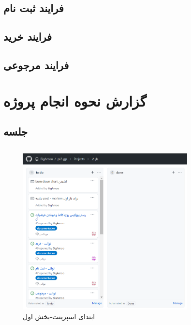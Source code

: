 \documentclass[12pt,a4paper]{article}
\begin{document}
	
	\subsection{فرایند ثبت نام} \label{section.sequence.register}
	
	
	\subsection{فرایند خرید} \label{section.sequence.buy}
	
	
	\subsection{فرایند مرجوعی} \label{section.sequence.return}
	
	

\pagebreak

\section{گزارش نحوه انجام پروژه} \label{section.report}
	
	\subsection{جلسه } \label{section.report.postMortem}
	
	\pagebreak
	
	\subsection{} \label{section.report.taskBoard}
			\begin{figure}[h!]
			\begin{center}
				\includegraphics[width=9cm]{images/screenshot_1.png}	
			\end{center}
			\caption{ابتدای اسپرینت-بخش اول}
		\end{figure}
		
\end{document}
